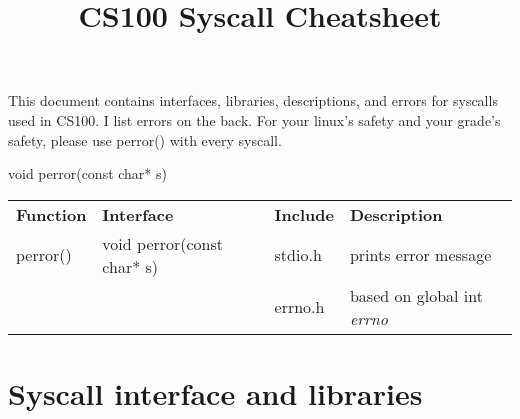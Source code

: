 \documentclass{article}
\title{CS100 Syscall Cheatsheet}
\author{}
\date{}
\begin{document}
\maketitle

\large This document contains interfaces, libraries, descriptions, and errors for 
syscalls used in CS100. I list errors on the back. For your linux's safety and 
your grade's safety, please use perror() with every syscall.

\smallskip
\begin{code}void perror(const char* s)\end{code}


\medskip
\begin{tabular}{llll}
    \bf Function & \bf Interface & \bf Include & \bf Description\\
    perror() & void perror(const char* s) &  stdio.h &  prints error message\\
    && errno.h & based on global int \it errno \rm
\end{tabular}
\normalsize

\section{Syscall interface and libraries}
\end{document}
